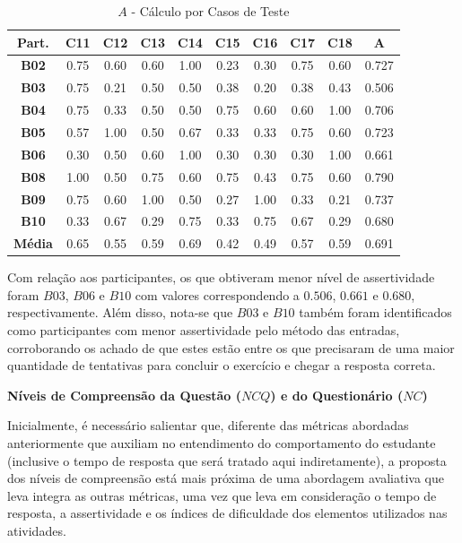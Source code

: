 \begin{table}[htbp]
	\centering
	\caption{$A$ - Cálculo por Casos de Teste}
	\begin{tabular}{|c|c|c|c|c|c|c|c|c|c|}
		\hline
		\rowcolor[HTML]{D9D9D9} 
		\cellcolor[HTML]{D0CECE}\textbf{Part.} & \textbf{C11} & \textbf{C12} & \textbf{C13} & \textbf{C14} & \textbf{C15} & \textbf{C16} & \textbf{C17} & \textbf{C18} & \cellcolor[HTML]{D0CECE}\textbf{A} \\ \hline
		\textbf{B02} & 0.75 & 0.60 & 0.60 & 1.00 & 0.23 & 0.30 & 0.75 & 0.60 & 0.727 \\ \hline
		\rowcolor[HTML]{F2F2F2} 
		\textbf{B03} & 0.75 & 0.21 & 0.50 & 0.50 & 0.38 & 0.20 & 0.38 & 0.43 & 0.506 \\ \hline
		\textbf{B04} & 0.75 & 0.33 & 0.50 & 0.50 & 0.75 & 0.60 & 0.60 & 1.00 & 0.706 \\ \hline
		\rowcolor[HTML]{F2F2F2} 
		\textbf{B05} & 0.57 & 1.00 & 0.50 & 0.67 & 0.33 & 0.33 & 0.75 & 0.60 & 0.723 \\ \hline
		\textbf{B06} & 0.30 & 0.50 & 0.60 & 1.00 & 0.30 & 0.30 & 0.30 & 1.00 & 0.661 \\ \hline
		\rowcolor[HTML]{F2F2F2} 
		\textbf{B08} & 1.00 & 0.50 & 0.75 & 0.60 & 0.75 & 0.43 & 0.75 & 0.60 & 0.790 \\ \hline
		\textbf{B09} & 0.75 & 0.60 & 1.00 & 0.50 & 0.27 & 1.00 & 0.33 & 0.21 & 0.737 \\ \hline
		\rowcolor[HTML]{F2F2F2} 
		\textbf{B10} & 0.33 & 0.67 & 0.29 & 0.75 & 0.33 & 0.75 & 0.67 & 0.29 & 0.680 \\ \hline
		\textbf{Média} & 0.65 & 0.55 & 0.59 & 0.69 & 0.42 & 0.49 & 0.57 & 0.59 & 0.691 \\ \hline
	\end{tabular}
	\label{tab:F3_A2_A_CASOS2}
\end{table}

Com relação aos participantes, os que obtiveram menor nível de assertividade foram $B03$, $B06$ e $B10$ com valores correspondendo a $0.506$, $0.661$ e $0.680$, respectivamente. Além disso, nota-se que $B03$ e $B10$ também foram identificados como participantes com menor assertividade pelo método das entradas, corroborando os achado de que estes estão entre os que precisaram de uma maior quantidade de tentativas para concluir o exercício e chegar a resposta correta.

\textbf{Níveis de Compreensão da Questão ($NCQ$) e do Questionário ($NC$)}

Inicialmente, é necessário salientar que, diferente das métricas abordadas anteriormente que auxiliam no entendimento do comportamento do estudante (inclusive o tempo de resposta que será tratado aqui indiretamente), a proposta dos níveis de compreensão está mais próxima de uma abordagem avaliativa que leva integra as outras métricas, uma vez que leva em consideração o tempo de resposta, a assertividade e os índices de dificuldade dos elementos utilizados nas atividades.


